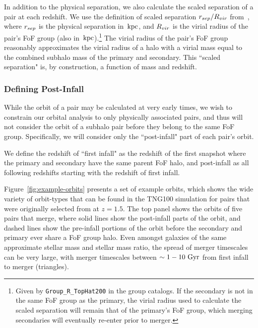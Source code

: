 \documentclass[twocolumn,linenumbers]{aastex631}
\newcommand{\chambe}{\citet{Chamberlain2024}}
\begin{document}
In addition to the physical separation, we also calculate the scaled separation of a pair at each redshift. We use the definition of scaled separation $r_{sep}/R_{vir}$ from~\cite{Chamberlain2024}, where $r_{sep}$ is the physical separation in $\mathrm{\,kpc}$, and $R_{vir}$ is the virial radius of the pair's FoF group (also in $\mathrm{\,kpc}$).\footnote{Given by \texttt{Group\_R\_TopHat200} in the group catalogs. If the secondary is not in the same FoF group as the primary, the virial radius used to calculate the scaled separation will remain that of the primary's FoF group, which merging secondaries will eventually re-enter prior to merger.} 
The virial radius of the pair's FoF group reasonably approximates the virial radius of a halo with a virial mass equal to the combined subhalo mass of the primary and secondary.
This ``scaled separation" is, by construction, a function of mass and redshift.


\subsubsection{Defining Post-Infall}
While the orbit of a pair may be calculated at very early times, we wish to constrain our orbital analysis to only physically associated pairs, and thus will not consider the orbit of a subhalo pair before they belong to the same FoF group. 
Specifically, we will consider only the ``post-infall" part of each pair's orbit. 

We define the redshift of ``first infall" as the redshift of the first snapshot where the primary and secondary have the same parent FoF halo, and post-infall as all following redshifts starting with the redshift of first infall. 

Figure~\ref{fig:example-orbits} presents a set of example orbits, which shows the wide variety of orbit-types that can be found in the TNG100 simulation for pairs that were originally selected from \chambe{} at $z=1.5$. 
The top panel shows the orbits of five pairs that merge, where solid lines show the post-infall parts of the orbit, and dashed lines show the pre-infall portions of the orbit before the secondary and primary ever share a FoF group halo. 
Even amongst galaxies of the same approximate stellar mass and stellar mass ratio, the spread of merger timescales can be very large, with merger timescales between $\sim1-10\,\mathrm{\,Gyr}$ from first infall to merger (triangles). 
\end{document}
